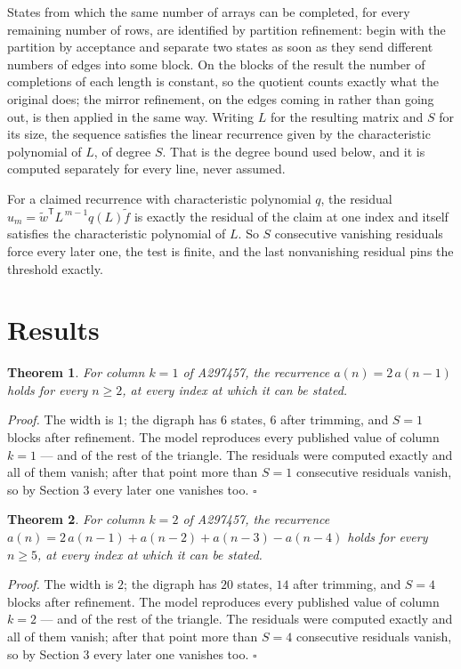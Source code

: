 \documentclass[11pt]{article}
\newtheorem{theorem}{Theorem}
\theoremstyle{definition}
\begin{document}
States from which the same number of arrays can be completed, for every remaining number of rows, are identified by partition refinement: begin with the partition by acceptance and separate two states as soon as they send different numbers of edges into some block. On the blocks of the result the number of completions of each length is constant, so the quotient counts exactly what the original does; the mirror refinement, on the edges coming in rather than going out, is then applied in the same way. Writing $L$ for the resulting matrix and $S$ for its size, the sequence satisfies the linear recurrence given by the characteristic polynomial of $L$, of degree $S$. That is the degree bound used below, and it is computed separately for every line, never assumed.

For a claimed recurrence with characteristic polynomial $q$, the residual $u_m = \tilde w^{\mathsf T}L^{\,m-1}q(L)\tilde f$ is exactly the residual of the claim at one index and itself satisfies the characteristic polynomial of $L$. So $S$ consecutive vanishing residuals force every later one, the test is finite, and the last nonvanishing residual pins the threshold exactly.

\section{Results}

\begin{theorem} For column $k = 1$ of A297457, the recurrence $a(n) = 2\,a(n-1)$ holds for every $n \ge 2$, at every index at which it can be stated.\end{theorem}

{\itshape Proof.} The width is $1$; the digraph has $6$ states, $6$ after trimming, and $S = 1$ blocks after refinement. The model reproduces every published value of column $k = 1$ --- and of the rest of the triangle. The residuals were computed exactly and all of them vanish; after that point more than $S = 1$ consecutive residuals vanish, so by Section 3 every later one vanishes too. $\square$

\begin{theorem} For column $k = 2$ of A297457, the recurrence $a(n) = 2\,a(n-1) + a(n-2) + a(n-3) - a(n-4)$ holds for every $n \ge 5$, at every index at which it can be stated.\end{theorem}

{\itshape Proof.} The width is $2$; the digraph has $20$ states, $14$ after trimming, and $S = 4$ blocks after refinement. The model reproduces every published value of column $k = 2$ --- and of the rest of the triangle. The residuals were computed exactly and all of them vanish; after that point more than $S = 4$ consecutive residuals vanish, so by Section 3 every later one vanishes too. $\square$
\end{document}
